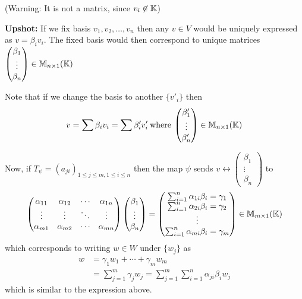 (Warning: It is not a matrix, since \(v_i \not \in \mathbb{K}\))

\textbf{Upshot:} If we fix basis \(v_1, v_2, \dots, v_n\) then any \(v \in V\) would be uniquely expressed as \(v = \beta_i v_i\). The fixed basis would then correspond to unique matrices \(\begin{pmatrix}
        \beta_1 \\ \vdots \\ \beta_n
    \end{pmatrix} \in \mathbb{M}_{n \times 1}(\mathbb{K})\)

Note that if we change the basis to another \(\{v'_i\}\) then \[
    v = \sum \beta_i v_i = \sum \beta'_i v'_i \:\text{where}\:  \begin{pmatrix}
            \beta'_1 \\ \vdots \\ \beta'_n
        \end{pmatrix} \in \mathbb{M}_{n \times 1}(\mathbb{K})
\]

Now, if \(T_\psi = (a_{ji})_{1 \leq j \leq m, 1 \leq i \leq n}\) then the map \(\psi\) sends \(v \leftrightarrow \begin{pmatrix}
        \beta_1 \\ \vdots \\ \beta_n
    \end{pmatrix}\) to
\[
    \begin{pmatrix}
            \alpha_{11} & \alpha_{12} & \cdots & \alpha_{1n} \\
            \vdots      & \vdots      & \ddots & \vdots      \\
            \alpha_{m1} & \alpha_{m2} & \cdots & \alpha_{mn}
        \end{pmatrix}
    \begin{pmatrix}
            \beta_1 \\ \vdots \\ \beta_n
        \end{pmatrix} = \begin{pmatrix}
            \sum_{i=1}^{n}\alpha_{1i}\beta_i = \gamma_1 \\
            \sum_{i=1}^{n}\alpha_{2i}\beta_i = \gamma_2 \\
            \vdots                                      \\
            \sum_{i=1}^{n}\alpha_{mi}\beta_i = \gamma_m \\
        \end{pmatrix} \in \mathbb{M}_{m \times 1}(\mathbb{K})
\]
which corresponds to writing \(w \in W\) under \(\{w_j\}\) as \begin{align*}
    w & = \gamma_1 w_1 + \cdots + \gamma_m w_m                                              \\
      & = \sum_{j=1}^{m}\gamma_j w_j = \sum_{j=1}^{m} \sum_{i=1}^{n} \alpha_{ji}\beta_i w_j
\end{align*}
which is similar to the expression above.

